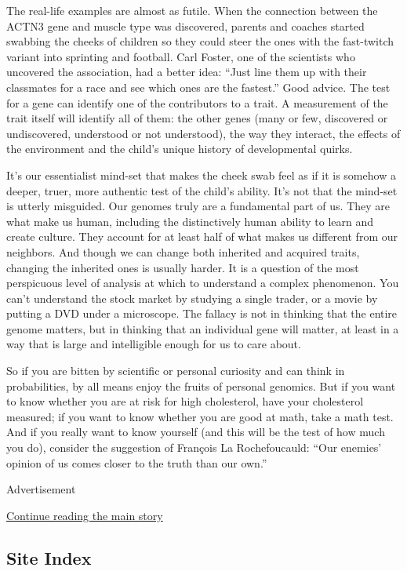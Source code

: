 The real-life examples are almost as futile. When the connection between
the ACTN3 gene and muscle type was discovered, parents and coaches
started swabbing the cheeks of children so they could steer the ones
with the fast-twitch variant into sprinting and football. Carl Foster,
one of the scientists who uncovered the association, had a better idea:
``Just line them up with their classmates for a race and see which ones
are the fastest.'' Good advice. The test for a gene can identify one of
the contributors to a trait. A measurement of the trait itself will
identify all of them: the other genes (many or few, discovered or
undiscovered, understood or not understood), the way they interact, the
effects of the environment and the child's unique history of
developmental quirks.

It's our essentialist mind-set that makes the cheek swab feel as if it
is somehow a deeper, truer, more authentic test of the child's ability.
It's not that the mind-set is utterly misguided. Our genomes truly are a
fundamental part of us. They are what make us human, including the
distinctively human ability to learn and create culture. They account
for at least half of what makes us different from our neighbors. And
though we can change both inherited and acquired traits, changing the
inherited ones is usually harder. It is a question of the most
perspicuous level of analysis at which to understand a complex
phenomenon. You can't understand the stock market by studying a single
trader, or a movie by putting a DVD under a microscope. The fallacy is
not in thinking that the entire genome matters, but in thinking that an
individual gene will matter, at least in a way that is large and
intelligible enough for us to care about.

So if you are bitten by scientific or personal curiosity and can think
in probabilities, by all means enjoy the fruits of personal genomics.
But if you want to know whether you are at risk for high cholesterol,
have your cholesterol measured; if you want to know whether you are good
at math, take a math test. And if you really want to know yourself (and
this will be the test of how much you do), consider the suggestion of
François La Rochefoucauld: ``Our enemies' opinion of us comes closer to
the truth than our own.''

Advertisement

\protect\hyperlink{after-bottom}{Continue reading the main story}

\hypertarget{site-index}{%
\subsection{Site Index}\label{site-index}}

